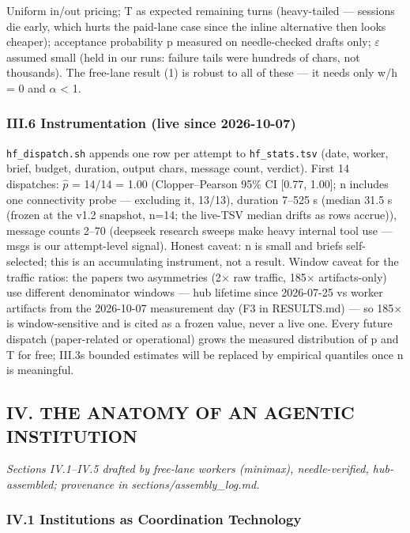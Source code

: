 \documentclass[
]{article}
\begin{document}
Uniform in/out pricing; T as expected remaining turns (heavy-tailed ---
sessions die early, which hurts the paid-lane case since the inline
alternative then looks cheaper); acceptance probability p measured on
needle-checked drafts only; $\varepsilon$ assumed small (held in our runs: failure
tails were hundreds of chars, not thousands). The free-lane result (1)
is robust to all of these --- it needs only w/h = 0 and $\alpha$ \textless{} 1.

\subsubsection{III.6 Instrumentation (live since
2026-10-07)}\label{iii6-instrumentation-live-since-2026-10-07}

\texttt{hf\_dispatch.sh} appends one row per attempt to
\texttt{hf\_stats.tsv} (date, worker, brief, budget, duration, output
chars, message count, verdict). First 14 dispatches: $\hat{p}$ = 14/14 = 1.00
(Clopper--Pearson 95\% CI {[}0.77, 1.00{]}; n includes one connectivity
probe --- excluding it, 13/13), duration 7--525 s (median 31.5 s (frozen
at the v1.2 snapshot, n=14; the live-TSV median drifts as rows accrue)),
message counts 2--70 (deepseek research sweeps make heavy internal tool
use --- msgs is our attempt-level signal). Honest caveat: n is small and
briefs self-selected; this is an accumulating instrument, not a result.
Window caveat for the traffic ratios: the paper\textquotesingle s two
asymmetries (2$\times$ raw traffic, 185$\times$ artifacts-only) use different
denominator windows --- hub lifetime since 2026-07-25 vs worker
artifacts from the 2026-10-07 measurement day (F3 in RESULTS.md) --- so
185$\times$ is window-sensitive and is cited as a frozen value, never a live
one. Every future dispatch (paper-related or operational) grows the
measured distribution of p and T for free; III.3\textquotesingle s
bounded estimates will be replaced by empirical quantiles once n is
meaningful.

\subsection{IV. THE ANATOMY OF AN AGENTIC
INSTITUTION}\label{iv-the-anatomy-of-an-agentic-institution}

\emph{Sections IV.1--IV.5 drafted by free-lane workers (minimax),
needle-verified, hub-assembled; provenance in
sections/assembly\_log.md.}

\subsubsection{IV.1 Institutions as Coordination
Technology}\label{iv1-institutions-as-coordination-technology}
\end{document}
